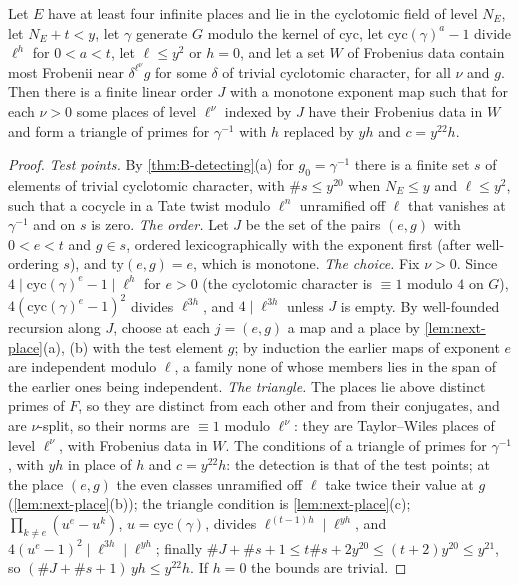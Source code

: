 \begin{theorem}\label{thm:triangles}
Let $E$ have at least four infinite places and lie in the cyclotomic field of level $N_E$, let $N_E+t<y$, let $\gamma$ generate $G$ modulo the kernel of $\mathrm{cyc}$, let $\mathrm{cyc}(\gamma)^a-1$ divide $\ell^h$ for $0<a<t$, let $\ell\le y^2$ or
$h=0$, and let a set $W$ of Frobenius data contain most Frobenii near $\delta^{\ell^\nu}g$ for some $\delta$ of trivial cyclotomic character, for all $\nu$ and $g$. Then there is a finite linear order $J$ with a monotone exponent map such that for
each $\nu>0$ some places of level $\ell^\nu$ indexed by $J$ have their Frobenius data in $W$ and form a triangle of primes for $\gamma^{-1}$ with $h$ replaced by $yh$ and $c=y^{22}h$.
\end{theorem}

\begin{proof}
\emph{Test points.} By \cref{thm:B-detecting}(a) for $g_0=\gamma^{-1}$ there is a finite set $s$ of elements of trivial cyclotomic character, with $\#s\le y^{20}$ when $N_E\le y$ and $\ell\le y^2$, such that a cocycle in a Tate twist modulo $\ell^n$ unramified off $\ell$
that vanishes at $\gamma^{-1}$ and on $s$ is zero. \emph{The order.} Let $J$ be the set of the pairs $(e,g)$ with $0<e<t$ and $g\in s$, ordered lexicographically with the exponent first (after well-ordering $s$), and $\mathrm{ty}(e,g)=e$, which is
monotone. \emph{The choice.} Fix $\nu>0$. Since $4\mid\mathrm{cyc}(\gamma)^e-1\mid\ell^h$ for $e>0$ (the cyclotomic character is $\equiv1$ modulo $4$ on $G$), $4(\mathrm{cyc}(\gamma)^e-1)^2$ divides $\ell^{3h}$, and $4\mid\ell^{3h}$ unless $J$ is empty. By well-founded recursion along $J$, choose at
each $j=(e,g)$ a map and a place by \cref{lem:next-place}(a), (b) with the test element $g$; by induction the earlier maps of exponent $e$ are independent modulo $\ell$, a family none of whose members lies in the span of the earlier
ones being independent. \emph{The triangle.} The places lie above distinct primes of $F$, so they are distinct from each other and from their conjugates, and are $\nu$-split, so their norms are $\equiv1$ modulo $\ell^\nu$: they are
Taylor--Wiles places of level $\ell^\nu$, with Frobenius data in $W$. The conditions of a triangle of primes for $\gamma^{-1}$, with $yh$ in place of $h$ and $c=y^{22}h$: the detection is that of the test points; at the place $(e,g)$ the even
classes unramified off $\ell$ take twice their value at $g$ (\cref{lem:next-place}(b)); the triangle condition is \cref{lem:next-place}(c); $\prod_{k\ne e}(u^e-u^k)$, $u=\mathrm{cyc}(\gamma)$, divides $\ell^{(t-1)h}\mid\ell^{yh}$, and $4(u^e-1)^2\mid\ell^{3h}\mid\ell^{yh}$;
finally $\#J+\#s+1\le t\#s+2y^{20}\le(t+2)y^{20}\le y^{21}$, so $(\#J+\#s+1)\,yh\le y^{22}h$. If $h=0$ the bounds are trivial.
\end{proof}

